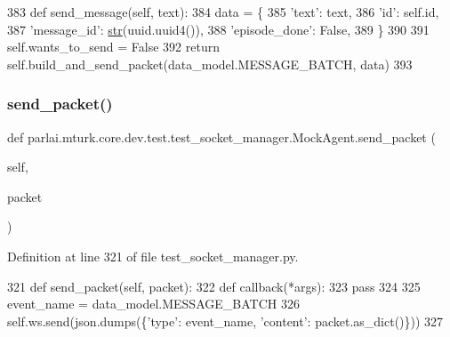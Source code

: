 \begin{DoxyCode}
383     \textcolor{keyword}{def }send\_message(self, text):
384         data = \{
385             \textcolor{stringliteral}{'text'}: text,
386             \textcolor{stringliteral}{'id'}: self.id,
387             \textcolor{stringliteral}{'message\_id'}: \hyperlink{namespacegenerate__task__READMEs_a5b88452ffb87b78c8c85ececebafc09f}{str}(uuid.uuid4()),
388             \textcolor{stringliteral}{'episode\_done'}: \textcolor{keyword}{False},
389         \}
390 
391         self.wants\_to\_send = \textcolor{keyword}{False}
392         \textcolor{keywordflow}{return} self.build\_and\_send\_packet(data\_model.MESSAGE\_BATCH, data)
393 
\end{DoxyCode}
\mbox{\label{classparlai_1_1mturk_1_1core_1_1dev_1_1test_1_1test__socket__manager_1_1MockAgent_a5f06298a6f48e04c3b5fc3412232f0dc}} 
\subsubsection{\texorpdfstring{send\+\_\+packet()}{send\_packet()}}
{\footnotesize\ttfamily def parlai.\+mturk.\+core.\+dev.\+test.\+test\+\_\+socket\+\_\+manager.\+Mock\+Agent.\+send\+\_\+packet (\begin{DoxyParamCaption}\item[{}]{self,  }\item[{}]{packet }\end{DoxyParamCaption})}



Definition at line 321 of file test\+\_\+socket\+\_\+manager.\+py.


\begin{DoxyCode}
321     \textcolor{keyword}{def }send\_packet(self, packet):
322         \textcolor{keyword}{def }callback(*args):
323             \textcolor{keywordflow}{pass}
324 
325         event\_name = data\_model.MESSAGE\_BATCH
326         self.ws.send(json.dumps(\{\textcolor{stringliteral}{'type'}: event\_name, \textcolor{stringliteral}{'content'}: packet.as\_dict()\}))
327 
\end{DoxyCode}


